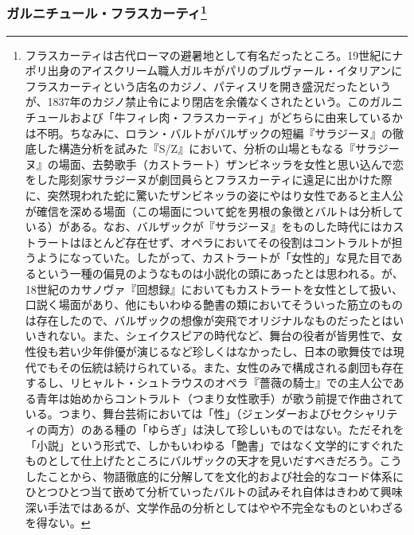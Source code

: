 \begin{recette}
\hypertarget{garniture-frascati}{%
\subsubsection[ガルニチュール・フラスカーティ]{\texorpdfstring{ガルニチュール・フラスカーティ\footnote{フラスカーティは古代ローマの避暑地として有名だったところ。19世紀にナポリ出身のアイスクリーム職人ガルキがパリのブルヴァール・イタリアンにフラスカーティという店名のカジノ、パティスリを開き盛況だったというが、1837年のカジノ禁止令により閉店を余儀なくされたという。このガルニチュールおよび「牛フィレ肉・フラスカーティ」がどちらに由来しているかは不明。ちなみに、ロラン・バルトがバルザックの短編『サラジーヌ』の徹底した構造分析を試みた『S/Z』において、分析の山場ともなる『サラジーヌ』の場面、去勢歌手（カストラート）ザンビネッラを女性と思い込んで恋をした彫刻家サラジーヌが劇団員らとフラスカーティに遠足に出かけた際に、突然現われた蛇に驚いたザンビネッラの姿にやはり女性であると主人公が確信を深める場面（この場面について蛇を男根の象徴とバルトは分析している）がある。なお、バルザックが『サラジーヌ』をものした時代にはカストラートはほとんど存在せず、オペラにおいてその役割はコントラルトが担うようになっていた。したがって、カストラートが「女性的」な見た目であるという一種の偏見のようなものは小説化の頭にあったとは思われる。が、18世紀のカサノヴァ『回想録』においてもカストラートを女性として扱い、口説く場面があり、他にもいわゆる艶書の類においてそういった筋立のものは存在したので、バルザックの想像が突飛でオリジナルなものだったとはいいきれない。また、シェイクスピアの時代など、舞台の役者が皆男性で、女性役も若い少年俳優が演じるなど珍しくはなかったし、日本の歌舞伎では現代でもその伝統は続けられている。また、女性のみで構成される劇団も存在するし、リヒャルト・シュトラウスのオペラ『薔薇の騎士』での主人公である青年は始めからコントラルト（つまり女性歌手）が歌う前提で作曲されている。つまり、舞台芸術においては「性」（ジェンダーおよびセクシャリティの両方）のある種の「ゆらぎ」は決して珍しいものではない。ただそれを「小説」という形式で、しかもいわゆる「艶書」ではなく文学的にすぐれたものとして仕上げたところにバルザックの天才を見いだすべきだろう。こうしたことから、物語徹底的に分解してを文化的および社会的なコード体系にひとつひとつ当て嵌めて分析ていったバルトの試みそれ自体はきわめて興味深い手法ではあるが、文学作品の分析としてはやや不完全なものといわざるを得ない。}}{ガルニチュール・フラスカーティ}}\label{garniture-frascati}}




\end{recette}
